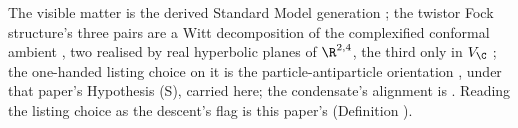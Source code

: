 The visible matter is the derived Standard Model generation \cite{ButlerT12}; the twistor Fock structure's three pairs are a Witt decomposition of the complexified conformal ambient \cite[Thm.~5.3]{ButlerT9}, two realised by real hyperbolic planes of $\R^{2,4}$, the third only in $V_{\C}$ \cite[proof of Thm.~3.1]{ButlerT9}; the one-handed listing choice on it is the particle-antiparticle orientation \cite[Prop.~5.6]{ButlerT12}, under that paper's Hypothesis (S), carried here; the condensate's alignment is \cite[Prop.~4.3]{ButlerT13}. Reading the listing choice as the descent's flag is this paper's (Definition ).
